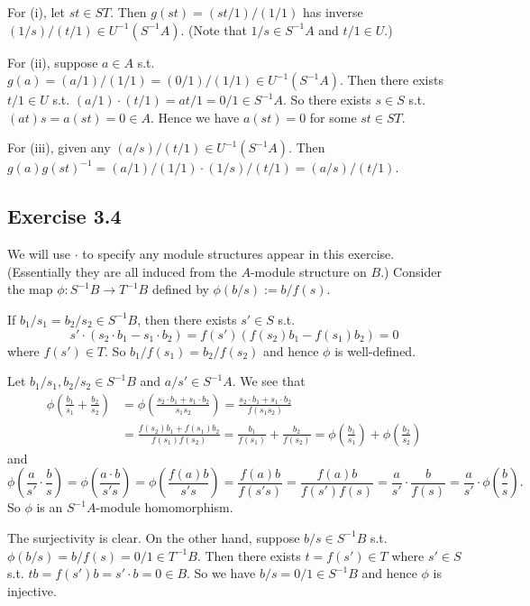 \documentclass[../A&M.tex]{subfiles}
\begin{document}
For (i), let $st \in ST$. Then $g(st) = (st/1)/(1/1)$ has inverse $(1/s)/(t/1) \in U^{-1}(S^{-1}A)$. (Note that $1/s \in S^{-1}A$ and $t/1 \in U$.)

For (ii), suppose $a\in A$ s.t. $g(a)=(a/1)/(1/1) = (0/1)/(1/1) \in U^{-1}(S^{-1}A)$. Then there exists $t/1 \in U$ s.t. $(a/1) \cdot (t/1) = at/1 = 0/1 \in S^{-1}A$. So there exists $s\in S$ s.t. $(at)s = a(st) = 0 \in A$. Hence we have $a(st)=0$ for some $st \in ST$.

For (iii), given any $(a/s)/(t/1) \in U^{-1}(S^{-1}A)$. Then $g(a)g(st)^{-1} = (a/1)/(1/1) \cdot (1/s)/(t/1) = (a/s)/(t/1)$.

\subsection*{Exercise 3.4}

We will use $\cdot$ to specify any module structures appear in this exercise. (Essentially they are all induced from the $A$-module structure on $B$.) Consider the map $\phi: S^{-1}B \to T^{-1}B$ defined by $\phi(b/s) := b/f(s)$.

If $b_1/s_1 = b_2/s_2 \in S^{-1}B$, then there exists $s' \in S$ s.t.
$$
s' \cdot (s_2\cdot b_1 - s_1 \cdot b_2)
= f(s')(f(s_2)b_1-f(s_1)b_2)
= 0 
$$
where $f(s')\in T$. So $b_1/f(s_1) = b_2/f(s_2)$ and hence $\phi$ is well-defined.

Let $b_1/s_1, b_2/s_2 \in S^{-1}B$ and $a/s' \in S^{-1}A$. We see that
\begin{align*}
\phi \left( \frac{b_1}{s_1} + \frac{b_2}{s_2} \right)
&= \phi \left( \frac{s_2 \cdot b_1 + s_1 \cdot b_2}{s_1s_2} \right)
= \frac{s_2 \cdot b_1 + s_1 \cdot b_2}{f(s_1s_2)}  \\
&= \frac{f(s_2)b_1 + f(s_1)b_2}{f(s_1)f(s_2)}  
= \frac{b_1}{f(s_1)} + \frac{b_2}{f(s_2)}
= \phi \left( \frac{b_1}{s_1} \right) + \phi \left( \frac{b_2}{s_2} \right)
\end{align*}
and
$$
\phi \left( \frac{a}{s'} \cdot \frac{b}{s} \right)
= \phi \left( \frac{a \cdot b}{s's} \right)
= \phi \left( \frac{f(a)b}{s's} \right)
= \frac{f(a)b}{f(s's)}
= \frac{f(a)b}{f(s')f(s)}
= \frac{a}{s'} \cdot \frac{b}{f(s)}
= \frac{a}{s'} \cdot \phi \left( \frac{b}{s} \right).
$$
So $\phi$ is an $S^{-1}A$-module homomorphism.

The surjectivity is clear. On the other hand, suppose $b/s \in S^{-1}B$ s.t. $\phi(b/s) = b/f(s) = 0/1 \in T^{-1}B$. Then there exists $t = f(s') \in T$ where $s'\in S$ s.t. $tb = f(s') b = s' \cdot b = 0 \in B$. So we have $b/s = 0/1 \in S^{-1}B$ and hence $\phi$ is injective.
\end{document}
